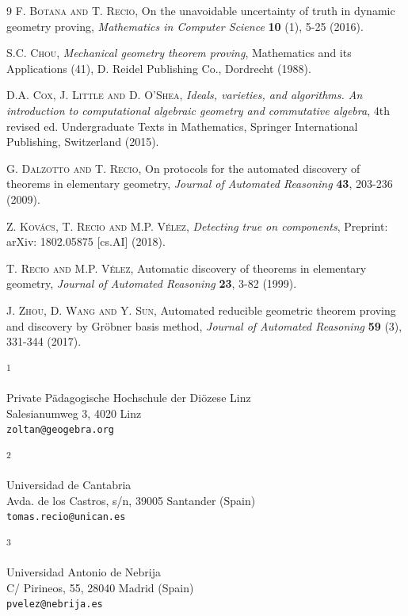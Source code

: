 \documentclass{article}
\newcommand{\ADDRESS}[2]{\noindent
  \textsuperscript{#1}\parbox[t]{0.9\textwidth}{#2} \vspace{6pt}}
\begin{document}

\begin{thebibliography}{9}
\textsc{F. Botana and T. Recio}, On the unavoidable uncertainty of truth in dynamic geometry proving, \emph{Mathematics in Computer Science} \textbf{10} (1), 5-25 (2016).

\textsc{S.C. Chou}, \emph{Mechanical geometry theorem proving}, Mathematics and its
  Applications (41), D. Reidel Publishing Co., Dordrecht (1988).
  
\textsc{D.A. Cox, J. Little and D. O'Shea}, \emph{Ideals, varieties, and algorithms. An
  introduction to computational algebraic geometry and commutative algebra}, 4th
  revised ed. Undergraduate Texts in Mathematics, Springer International Publishing, Switzerland (2015).

\textsc{G. Dalzotto and T. Recio}, On protocols for the automated discovery of theorems in elementary geometry, \emph{Journal of Automated Reasoning} \textbf{43}, 203-236 (2009).
  

\textsc{Z. Kov\'acs,  T. Recio and  M.P. V\'elez}, \textit{Detecting true on components}, Preprint: arXiv: 1802.05875  [cs.AI] (2018).

\textsc{T. Recio and  M.P. V\'elez},  Automatic discovery of theorems in elementary geometry, \emph{Journal of Automated Reasoning} \textbf{23}, 3-82 (1999).

\textsc{J. Zhou, D. Wang and Y. Sun},  Automated reducible geometric theorem proving and discovery by Gr\"obner basis method, \emph{Journal of Automated Reasoning}  \textbf{59} (3), 331-344 (2017).

  
\end{thebibliography}

\vspace{1cm}

\ADDRESS{1}{
Private P\"adagogische Hochschule der Di\"ozese Linz \\
Salesianumweg 3, 4020 Linz \\
\texttt{zoltan@geogebra.org}
}

\vspace{.5cm}

\ADDRESS{2}{
Universidad de Cantabria \\
Avda. de los Castros, s/n, 39005 Santander (Spain) \\
\texttt{tomas.recio@unican.es}
}
\vspace{.5cm}

\ADDRESS{3}{
Universidad Antonio de Nebrija \\
C/ Pirineos, 55, 28040 Madrid (Spain) \\
\texttt{pvelez@nebrija.es}
}
\end{document}
